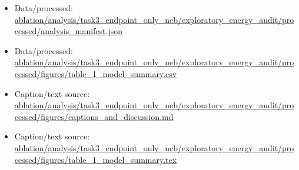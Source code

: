 \begin{itemize}[leftmargin=1.4em,noitemsep]
\item Data/processed: \begingroup\scriptsize\url{ablation/analysis/task3_endpoint_only_neb/exploratory_energy_audit/processed/analysis_manifest.json}\endgroup
\item Data/processed: \begingroup\scriptsize\url{ablation/analysis/task3_endpoint_only_neb/exploratory_energy_audit/processed/figures/table_1_model_summary.csv}\endgroup
\item Caption/text source: \begingroup\scriptsize\url{ablation/analysis/task3_endpoint_only_neb/exploratory_energy_audit/processed/figures/captions_and_discussion.md}\endgroup
\item Caption/text source: \begingroup\scriptsize\url{ablation/analysis/task3_endpoint_only_neb/exploratory_energy_audit/processed/figures/table_1_model_summary.tex}\endgroup
\end{itemize}
